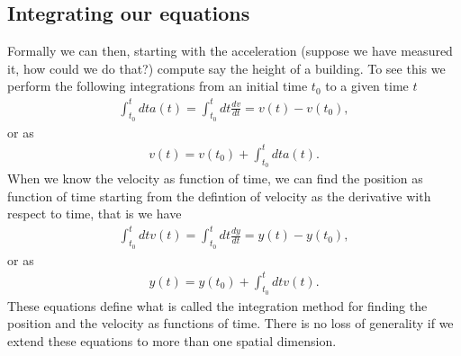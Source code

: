 \documentclass[letterpaper,10pt,english]{sphinxmanual}
\begin{document}
\subsection{Integrating our equations}
\label{\detokenize{chapter2:integrating-our-equations}}
Formally we can then, starting with the acceleration (suppose we have measured it, how could we do that?)
compute say the height of a building.  To see this we perform the following integrations from an initial time \(t_0\)  to a given time \(t\)
\begin{equation*}
\begin{split}
\int_{t_0}^t dt a(t) = \int_{t_0}^t dt \frac{dv}{dt} = v(t)-v(t_0),
\end{split}
\end{equation*}
or as
\begin{equation*}
\begin{split}
v(t)=v(t_0)+\int_{t_0}^t dt a(t).
\end{split}
\end{equation*}
When we know the velocity as function of time, we can find the position as function of time starting from the defintion of velocity as the derivative with respect to time, that is we have
\begin{equation*}
\begin{split}
\int_{t_0}^t dt v(t) = \int_{t_0}^t dt \frac{dy}{dt} = y(t)-y(t_0),
\end{split}
\end{equation*}
or as
\begin{equation*}
\begin{split}
y(t)=y(t_0)+\int_{t_0}^t dt v(t).
\end{split}
\end{equation*}
These equations define what is called the integration method for
finding the position and the velocity as functions of time. There is
no loss of generality if we extend these equations to more than one
spatial dimension.
\end{document}
